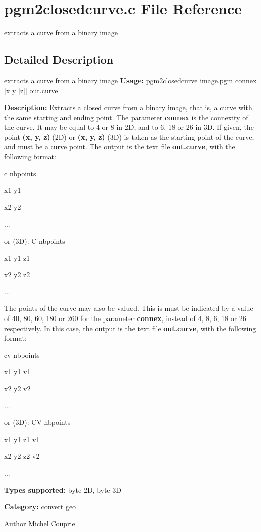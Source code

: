\section{pgm2closedcurve.c File Reference}
\label{pgm2closedcurve_8c}


extracts a curve from a binary image  




\subsection{Detailed Description}
extracts a curve from a binary image {\bfseries Usage:} pgm2closedcurve image.pgm connex [x y [z]] out.curve

{\bfseries Description:} Extracts a closed curve from a binary image, that is, a curve with the same starting and ending point. The parameter {\bfseries connex} is the connexity of the curve. It may be equal to 4 or 8 in 2D, and to 6, 18 or 26 in 3D. If given, the point {\bfseries (x, y, z)} (2D) or {\bfseries (x, y, z)} (3D) is taken as the starting point of the curve, and must be a curve point. The output is the text file {\bfseries out.curve}, with the following format:\par
 c nbpoints\par
 x1 y1\par
 x2 y2\par
 ...\par
 or (3D): C nbpoints\par
 x1 y1 z1\par
 x2 y2 z2\par
 ...\par


The points of the curve may also be valued. This is must be indicated by a value of 40, 80, 60, 180 or 260 for the parameter {\bfseries connex}, instead of 4, 8, 6, 18 or 26 respectively. In this case, the output is the text file {\bfseries out.curve}, with the following format:\par
 cv nbpoints\par
 x1 y1 v1\par
 x2 y2 v2\par
 ...\par
 or (3D): CV nbpoints\par
 x1 y1 z1 v1\par
 x2 y2 z2 v2\par
 ...\par


{\bfseries Types supported:} byte 2D, byte 3D

{\bfseries Category:} convert geo

\begin{DoxyAuthor}{Author}
Michel Couprie 
\end{DoxyAuthor}
